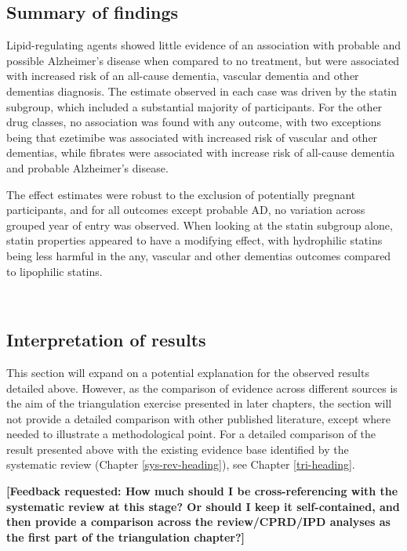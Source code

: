 \documentclass[a4paper, twoside]{templates/ociamthesis}
\begin{document}
\hypertarget{summary-of-findings-1}{%
\subsection{Summary of findings}\label{summary-of-findings-1}}

Lipid-regulating agents showed little evidence of an association with probable and possible Alzheimer's disease when compared to no treatment, but were associated with increased risk of an all-cause dementia, vascular dementia and other dementias diagnosis. The estimate observed in each case was driven by the statin subgroup, which included a substantial majority of participants. For the other drug classes, no association was found with any outcome, with two exceptions being that ezetimibe was associated with increased risk of vascular and other dementias, while fibrates were associated with increase risk of all-cause dementia and probable Alzheimer's disease.

The effect estimates were robust to the exclusion of potentially pregnant participants, and for all outcomes except probable AD, no variation across grouped year of entry was observed. When looking at the statin subgroup alone, statin properties appeared to have a modifying effect, with hydrophilic statins being less harmful in the any, vascular and other dementias outcomes compared to lipophilic statins.

~

\hypertarget{interpretation-of-results}{%
\subsection{Interpretation of results}\label{interpretation-of-results}}

This section will expand on a potential explanation for the observed results detailed above. However, as the comparison of evidence across different sources is the aim of the triangulation exercise presented in later chapters, the section will not provide a detailed comparison with other published literature, except where needed to illustrate a methodological point. For a detailed comparison of the result presented above with the existing evidence base identified by the systematic review (Chapter \ref{sys-rev-heading}), see Chapter \ref{tri-heading}.

\textbf{{[}Feedback requested: How much should I be cross-referencing with the systematic review at this stage? Or should I keep it self-contained, and then provide a comparison across the review/CPRD/IPD analyses as the first part of the triangulation chapter?{]}}
\end{document}

